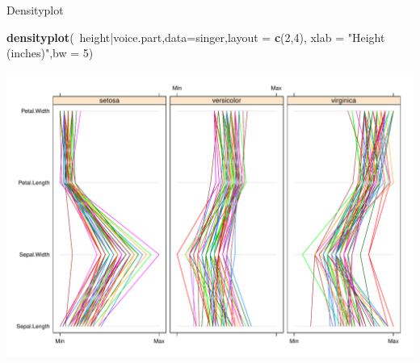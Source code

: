 \documentclass[ignorenonframetext,]{beamer}
\newenvironment{Shaded}{}{}
\newcommand{\KeywordTok}[1]{\textcolor[rgb]{0.00,0.44,0.13}{\textbf{{#1}}}}
\newcommand{\DataTypeTok}[1]{\textcolor[rgb]{0.56,0.13,0.00}{{#1}}}
\newcommand{\DecValTok}[1]{\textcolor[rgb]{0.25,0.63,0.44}{{#1}}}
\newcommand{\StringTok}[1]{\textcolor[rgb]{0.25,0.44,0.63}{{#1}}}
\newcommand{\NormalTok}[1]{{#1}}
\begin{document}
\begin{frame}[fragile]{Densityplot}

\begin{Shaded}
\begin{Highlighting}[]
\KeywordTok{densityplot}\NormalTok{(~height|voice.part,}\DataTypeTok{data=}\NormalTok{singer,}\DataTypeTok{layout =} \KeywordTok{c}\NormalTok{(}\DecValTok{2}\NormalTok{,}\DecValTok{4}\NormalTok{),}
            \DataTypeTok{xlab =} \StringTok{"Height (inches)"}\NormalTok{,}\DataTypeTok{bw =} \DecValTok{5}\NormalTok{)}
\end{Highlighting}
\end{Shaded}

\includegraphics{R_intern_files/figure-beamer/unnamed-chunk-231-1.pdf}

\end{frame}
\end{document}
